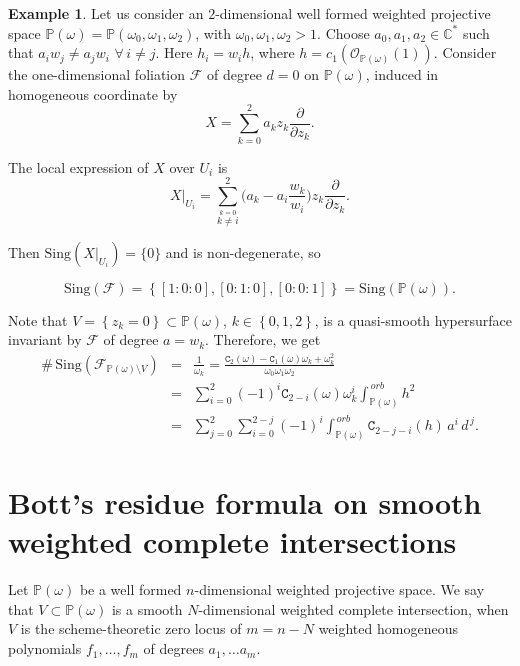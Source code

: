 \documentclass[11pt]{amsart}
\theoremstyle{plain}
\theoremstyle{definition}
\newtheorem{exe}{Example}[section]
\begin{document}
\begin{exe}
Let us consider an $2$-dimensional well formed weighted projective space 
$\mathbb{P}(\omega)=\mathbb{P}(\omega_0,\omega_1,\omega_2)$, with $\omega_0,\omega_1,\omega_2>1$. 
Choose $a_0, a_1, a_2\in \mathbb{C}^{\ast}$ such that  $a_{i}w_{j}\neq a_{j}w_{i}$ $\forall\,i\neq j$.
Here $h_i=w_ih$, where $h=c_{1}(\mathcal{O}_{\mathbb{P}(\omega)}(1))$.
Consider the one-dimensional foliation $\mathcal{F}$ of degree $d=0$ on $\mathbb{P}(\omega)$, induced in homogeneous coordinate by
$$X=\sum_{k=0}^{2}a_{k}z_{k}\frac{\partial}{\partial z_{k}}.$$

\noindent The local expression of $X$ over $U_i$ is
$$X|_{U_i}=\sum_{\stackrel{k=0}{k\neq i}}^2\Big(a_{k}-a_{i}\frac{w_{k}}{w_{i}}\Big)z_{k}\frac{\partial}{\partial z_{k}}.$$

\noindent Then $\mathrm{Sing}(X|_{U_i})=\{0\}$ and is non-degenerate, so

$$\mathrm{Sing}(\mathcal{F})=\left\{\left[1:0:0\right], \left[0:1:0\right],\left[0:0:1\right]\right\}=\mathrm{Sing}(\mathbb{P}(\omega)).$$

\noindent Note that $V=\left\{z_k=0\right\}\subset\mathbb{P}(\omega)$, $k\in\left\{0,1,2\right\}$, is a quasi-smooth hypersurface 
invariant by $\mathcal{F}$ of degree $a=w_k$. Therefore, we get
\begin{eqnarray*}
\#\,\mathrm{Sing}(\mathcal{F}_{\mathbb{P}(\omega)\setminus V})
&=&\frac{1}{\omega_k}=\frac{\texttt{C}_2(\omega)-\texttt{C}_1(\omega)\omega_k+\omega_k^2}{\omega_0\omega_1\omega_2} \\
&=&\sum_{i=0}^2(-1)^{i}\texttt{C}_{2-i}(\omega)\omega_k^{i}\int_{\mathbb{P}(\omega)}^{\,orb}h^2 \\
&=&\sum_{j=0}^2\sum_{i=0}^{2-j}(-1)^{i}\int_{\mathbb{P}(\omega)}^{\,orb}\texttt{C}_{2-j-i}(h)\,a^{i}\,d^{\,j}.
\end{eqnarray*}
\end{exe}

\section{Bott's residue formula on smooth weighted complete intersections}
 
Let $\mathbb{P}(\omega)$ be a well formed $n$-dimensional weighted projective space.
We say that $V\subset\mathbb{P}(\omega)$ is a smooth $N$-dimensional weighted complete intersection, 
when $V$ is the scheme-theoretic zero locus of $m=n-N$ weighted homogeneous 
polynomials $f_1,\ldots,f_m$ of degrees $a_1,\ldots a_m$.
\end{document}
